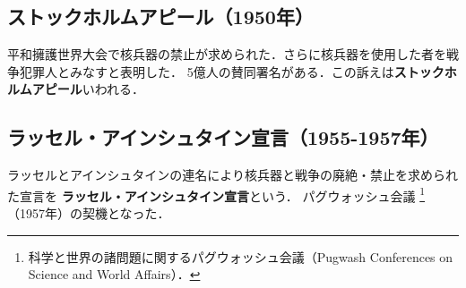         \subsection{ストックホルムアピール（1950年）}
        平和擁護世界大会で核兵器の禁止が求められた．さらに核兵器を使用した者を戦争犯罪人とみなすと表明した．
        5億人の賛同署名がある．この訴えは\textbf{ストックホルムアピール}いわれる．
  
        \subsection{ラッセル・アインシュタイン宣言（1955-1957年）}
        ラッセルとアインシュタインの連名により核兵器と戦争の廃絶・禁止を求められた宣言を
        \textbf{ラッセル・アインシュタイン宣言}という．
        パグウォッシュ会議
        \footnote{
            科学と世界の諸問題に関するパグウォッシュ会議（Pugwash Conferences on Science and World Affairs）．
        }
        （1957年）の契機となった．
    
 
